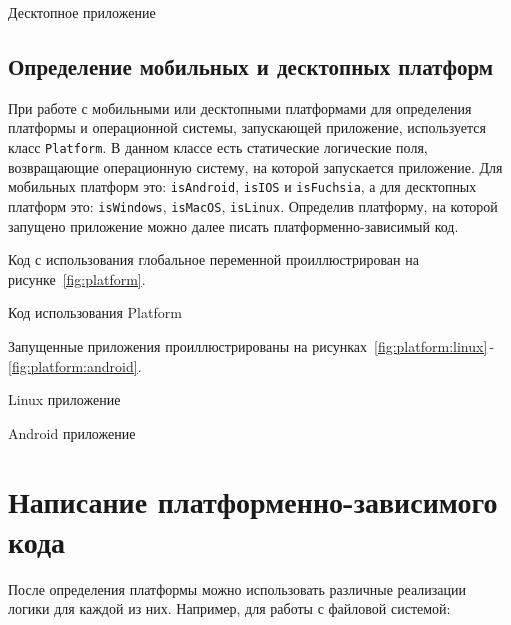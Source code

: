 \begin{image}
	\caption{Десктопное приложение}
	\label{fig:kisweb:linux}
\end{image}

\subsection{Определение мобильных и десктопных платформ}

При работе с мобильными или десктопными платформами
для определения платформы и операционной системы, запускающей приложение,
используется класс \texttt{Platform}.
В данном классе есть статические логические поля,
возвращающие операционную систему, на которой запускается приложение.
Для мобильных платформ это:
\texttt{isAndroid}, \texttt{isIOS} и \texttt{isFuchsia},
а для десктопных платформ это:
\texttt{isWindows}, \texttt{isMacOS}, \texttt{isLinux}.
Определив платформу, на которой запущено приложение можно
далее писать платформенно-зависимый код.

Код с использования глобальное переменной проиллюстрирован
на рисунке~\ref{fig:platform}.

\begin{image}
	\caption{Код использования Platform}
	\label{fig:platform}
\end{image}

Запущенные приложения проиллюстрированы
на рисунках~\ref{fig:platform:linux}\,-\,\ref{fig:platform:android}.

\begin{image}
	\caption{Linux приложение}
	\label{fig:platform:linux}
\end{image}

\begin{image}
	\caption{Android приложение}
	\label{fig:platform:android}
\end{image}

\section{Написание платформенно-зависимого кода}

После определения платформы можно использовать различные реализации
логики для каждой из них.
Например, для работы с файловой системой:


